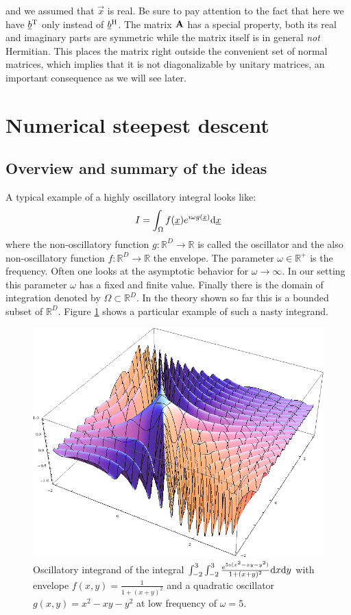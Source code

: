 \documentclass[a4paper,10pt]{article}
\begin{document}
and we assumed that $\vec{x}$ is real. Be sure to pay attention to
the fact that here we have $\underline{b}{}^{\textnormal{T}}$ only instead of $\underline{b}{}^{\textnormal{H}}$.
The matrix $\mathbf{A}$ has a special property, both its real and
imaginary parts are symmetric while the matrix itself is in general
\emph{not} Hermitian. This places the matrix right outside the convenient
set of normal matrices, which implies that it is not diagonalizable
by unitary matrices,  an important  consequence as we will see later.


\section{Numerical steepest descent}

\subsection{Overview and summary of the ideas}


A typical example of a highly oscillatory integral looks like:
\begin{equation}
  I = \int_{\Omega} f(\underline{x}) e^{\imath \omega g(\underline{x})} \mathrm{d}\underline{x}
\end{equation}
where the non-oscillatory function $g:\mathbb{R}^D \rightarrow \mathbb{R}$
is called the oscillator and the also non-oscillatory function
$f:\mathbb{R}^D \rightarrow \mathbb{R}$ the envelope. The parameter
$\omega \in \mathbb{R}^{+}$ is the frequency. Often one looks at the
asymptotic behavior for $\omega \rightarrow \infty$. In our setting
this parameter $\omega$ has a fixed and finite value.
Finally there is the domain of integration denoted by $\Omega \subset \mathbb{R}^D$.
In the theory shown so far this is a bounded subset of $\mathbb{R}^D$.
Figure \ref{fig:oscillatory_example_2d} shows a particular
example of such a nasty integrand.

\begin{figure}[h]
  \centering
  \includegraphics[width=0.6\linewidth]{fig/oscillatory_example_2d.png}
  \caption{Oscillatory integrand of the integral
  $\int_{-2}^3 \int_{-2}^3 \frac{e^{5 \imath (x^2-x y-y^2)}}{1 + (x+y)^2} \mathrm{d}x \mathrm{d}y  $
  with envelope $f(x,y) = \frac{1}{1 + (x+y)^2}$ and a quadratic oscillator
  $g(x,y) = x^2 - x y - y^2$ at low frequency of $\omega = 5$.}
  \label{fig:oscillatory_example_2d}
\end{figure}
\end{document}
